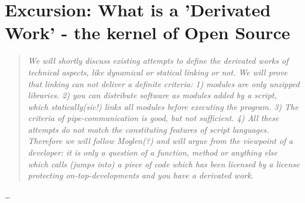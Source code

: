 %
%
%
%
%



\section{Excursion: What is a 'Derivated Work' - the kernel of Open Source}
\footnotesize
\begin{quote}\itshape
We will shortly discuss existing attempts to define the derivated works of
technical aspects, like dynamical or statical linking or not. We will
prove that linking can not deliver a definite criteria: 1) modules are only
unzipped libraries. 2) you can distribute software as modules added by a script,
which statically(sic!) links all modules before executing the program. 3) The
criteria of pipe-communication is good, but not sufficient. 4) All these
attempts do not match the constituting features of script languages. Therefore we
will follow Moglen(?) and will argue from the viewpoint of a developer: it is
only a question of a function, method or anything else which calls (jumps into)
a piece of code which has been licensed by a license protecting
on-top-developments and you have a derivated work.
\end{quote}
\normalsize
\ldots


%
